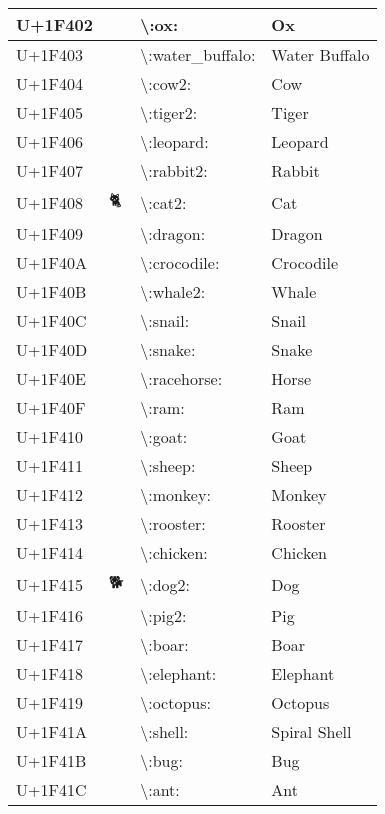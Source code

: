 \begin{table}[h]
\begin{tabulary}{\linewidth}{|L|L|L|L|}
\hline
U+1F402 & 🐂 & {\textbackslash}:ox: & Ox \\
\hline
U+1F403 & 🐃 & {\textbackslash}:water\_buffalo: & Water Buffalo \\
\hline
U+1F404 & 🐄 & {\textbackslash}:cow2: & Cow \\
\hline
U+1F405 & 🐅 & {\textbackslash}:tiger2: & Tiger \\
\hline
U+1F406 & 🐆 & {\textbackslash}:leopard: & Leopard \\
\hline
U+1F407 & 🐇 & {\textbackslash}:rabbit2: & Rabbit \\
\hline
U+1F408 & 🐈 & {\textbackslash}:cat2: & Cat \\
\hline
U+1F409 & 🐉 & {\textbackslash}:dragon: & Dragon \\
\hline
U+1F40A & 🐊 & {\textbackslash}:crocodile: & Crocodile \\
\hline
U+1F40B & 🐋 & {\textbackslash}:whale2: & Whale \\
\hline
U+1F40C & 🐌 & {\textbackslash}:snail: & Snail \\
\hline
U+1F40D & 🐍 & {\textbackslash}:snake: & Snake \\
\hline
U+1F40E & 🐎 & {\textbackslash}:racehorse: & Horse \\
\hline
U+1F40F & 🐏 & {\textbackslash}:ram: & Ram \\
\hline
U+1F410 & 🐐 & {\textbackslash}:goat: & Goat \\
\hline
U+1F411 & 🐑 & {\textbackslash}:sheep: & Sheep \\
\hline
U+1F412 & 🐒 & {\textbackslash}:monkey: & Monkey \\
\hline
U+1F413 & 🐓 & {\textbackslash}:rooster: & Rooster \\
\hline
U+1F414 & 🐔 & {\textbackslash}:chicken: & Chicken \\
\hline
U+1F415 & 🐕 & {\textbackslash}:dog2: & Dog \\
\hline
U+1F416 & 🐖 & {\textbackslash}:pig2: & Pig \\
\hline
U+1F417 & 🐗 & {\textbackslash}:boar: & Boar \\
\hline
U+1F418 & 🐘 & {\textbackslash}:elephant: & Elephant \\
\hline
U+1F419 & 🐙 & {\textbackslash}:octopus: & Octopus \\
\hline
U+1F41A & 🐚 & {\textbackslash}:shell: & Spiral Shell \\
\hline
U+1F41B & 🐛 & {\textbackslash}:bug: & Bug \\
\hline
U+1F41C & 🐜 & {\textbackslash}:ant: & Ant \\

\end{tabulary}
\end{table}
